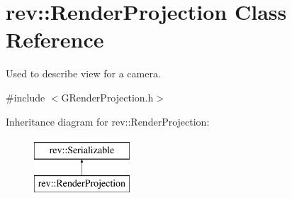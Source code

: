 \hypertarget{classrev_1_1_render_projection}{}\section{rev\+::Render\+Projection Class Reference}
\label{classrev_1_1_render_projection}


Used to describe view for a camera.  




{\ttfamily \#include $<$G\+Render\+Projection.\+h$>$}

Inheritance diagram for rev\+::Render\+Projection\+:\begin{figure}[H]
\begin{center}
\leavevmode
\includegraphics[height=2.000000cm]{classrev_1_1_render_projection}
\end{center}
\end{figure}
